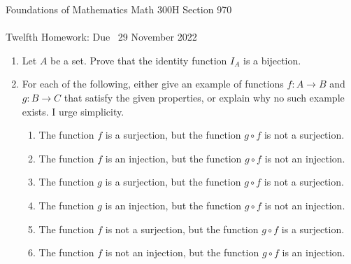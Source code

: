 \documentclass[12pt]{article}
\begin{document}
\LARGE 
\noindent
{\color{Maroon}Foundations of Mathematics \hfill Math 300H Section 970}\vspace{2pt}\\
\Large \vspace{2pt}\\
\large
Twelfth Homework: \hfill Due \  29 November 2022
\normalsize\medskip


\noindent{\color{blue}\rule{528.3675pt}{2pt}}


\begin{enumerate}  %




  \item  Let $A$ be a set.  Prove that the identity function $I_A$ is a bijection.

\item For each of the following, either give an example of functions $f\colon A\to B$ and $g\colon B\to C$ that satisfy the
  given properties, or explain why no such example exists.  I urge simplicity.

 \begin{enumerate}

  \item The function $f$ is a surjection, but the function $g\circ f$ is not a surjection.

  \item The function $f$ is an injection, but the function $g\circ f$ is not an injection.

  \item The function $g$ is a surjection, but the function $g\circ f$ is not a surjection.

  \item The function $g$ is an injection, but the function $g\circ f$ is not an injection.

  \item The function $f$ is not a surjection, but the function $g\circ f$ is a surjection.

  \item The function $f$ is not an injection, but the function $g\circ f$ is an injection.


\end{enumerate}
\end{enumerate}
\end{document}
